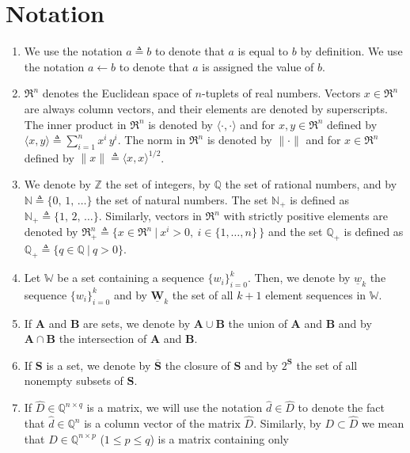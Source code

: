 \chapter{Notation}
\begin{enumerate}
\item
We use the notation $a \triangleq b$ to denote that $a$ is equal to $b$ by definition.
We use the notation $a \leftarrow b$ to denote that $a$ is assigned the value
of $b$.
\item 
$\Re^n$ denotes the Euclidean space of $n$-tuplets of real numbers. 
Vectors $x \in \Re^n$ are always column vectors, 
and their elements are denoted by superscripts. 
The inner product in $\Re^n$ is denoted by $\langle \cdot, \cdot \rangle$ and 
for $x,y \in \Re^n$ 
defined by $\langle x, y \rangle \triangleq \sum_{i=1}^n x^i \, y^i$. 
The norm in $\Re^n$ is denoted by $\|\cdot\|$ and 
for $x \in \Re^n$ defined by $\|x\|\triangleq \langle x, x \rangle^{1/2}$.
\item 
We denote by $\mathbb Z$ the set of integers, by $\mathbb Q$ 
the set of rational numbers, and by $\mathbb N \triangleq \{0, \, 1,
\, \ldots \}$ the set of natural numbers. The set
$\mathbb N_+$ is defined as $\mathbb N_+ \triangleq \{1, \, 2, \,
\ldots \}$.
Similarly, vectors in $\Re^n$ with strictly positive elements are denoted by 
$\Re_+^n \triangleq \{ x
\in \Re^n \ | \  x^i > 0, \ i \in \{ 1, \ldots , n \} \, \}$ 
and the set $\mathbb Q_+$
is defined as $\mathbb Q_+ \triangleq \{ q \in \mathbb Q \ | \ q > 0 \}$.
\item
Let $\mathbb W$ be a set containing a sequence
$\{ w_i \}_{i=0}^k$.
Then, we denote by $\underline w_k$ the sequence 
$\{ w_i \}_{i=0}^k$ and by $\underline{\mathbf W}_k$ the set
of all $k+1$ element sequences in $\mathbb W$.
\item 
If $\mathbf A$ and $\mathbf B$ are sets, 
we denote by $\mathbf A \cup \mathbf B$ the union of $\mathbf A$ and $\mathbf B$ and
by $\mathbf A \cap \mathbf B$ the intersection of $\mathbf A$ and $\mathbf B$.
\item
If $\mathbf S$ is a set, 
we denote by $\overline {\mathbf S}$ the closure of $\mathbf S$ and
by $2^{\mathbf S}$ the set of all
nonempty subsets of $\mathbf S$.
\item
If $\widehat D \in \mathbb Q^{n \times q}$ is a matrix, 
we will use the notation $\widehat d \in \widehat D$ 
to denote the fact that $\widehat d \in \mathbb Q^n$ is a 
column vector of the matrix $\widehat D$. Similarly, by 
$D \subset \widehat D$ we mean that $D \in
\mathbb Q^{n \times p}$ ($1 \le p \le q$) is a matrix containing only

\end{enumerate}
